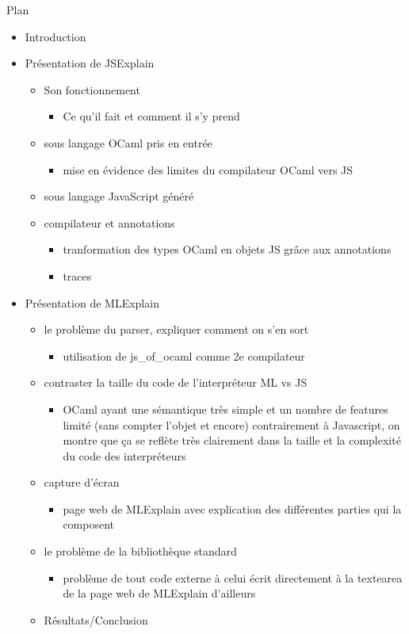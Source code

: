 \documentclass{easychair}
\begin{document}
Plan
\begin{itemize}
\item Introduction
\item Présentation de JSExplain
  \begin{itemize}
  \item Son fonctionnement
    \begin{itemize}
    \item Ce qu'il fait et comment il s'y prend
    \end{itemize}
  \item sous langage OCaml pris en entrée
    \begin{itemize}
    \item mise en évidence des limites du compilateur OCaml vers JS
    \end{itemize}
  \item sous langage JavaScript généré
  \item compilateur et annotations
    \begin{itemize}
    \item tranformation des types OCaml en objets JS grâce aux annotations
    \item traces
    \end{itemize}
  \end{itemize}
\item Présentation de MLExplain
  \begin{itemize}
  \item le problème du parser, expliquer comment on s'en sort
    \begin{itemize}
    \item utilisation de js\_of\_ocaml comme 2e compilateur
    \end{itemize}
  \item contraster la taille du code de l'interpréteur ML vs JS
    \begin{itemize}
    \item OCaml ayant une sémantique très simple et un nombre de features limité (sans compter l'objet et encore) contrairement à Javascript, on montre que ça se reflète très clairement dans la taille et la complexité du code des interpréteurs
    \end{itemize}
  \item capture d'écran
    \begin{itemize}
    \item page web de MLExplain avec explication des différentes parties qui la composent
    \end{itemize}
  \item le problème de la bibliothèque standard
    \begin{itemize}
    \item problème de tout code externe à celui écrit directement à la textearea de la page web de MLExplain d'ailleurs
    \end{itemize}
  \item Résultats/Conclusion
  \end{itemize}
\end{itemize}
\end{document}
